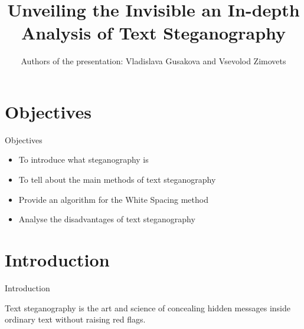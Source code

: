 \documentclass{beamer}
\title{Unveiling the Invisible an In-depth Analysis of Text Steganography }
\author{Authors of the presentation: Vladislava Gusakova and Vsevolod Zimovets }
\date{}
\begin{document}
\begin{frame}{}
    \titlepage
\end{frame}

\section{Objectives}
\begin{frame}{Objectives}

    \begin{itemize}
        \item To introduce what steganography is 
        \item To tell about the main methods of text steganography
        \item Provide an algorithm for the White Spacing method
        \item Analyse the disadvantages of text steganography 
    \end{itemize}

\end{frame}
\section{Introduction}
\begin{frame}{Introduction}
\begin{alertblock}{Text steganography}
    is the art and science of concealing hidden messages inside ordinary text without raising red flags.
\end{alertblock}
      
\end{frame}
\end{document}
